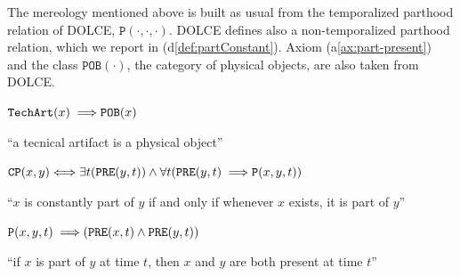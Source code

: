 \documentclass[sw]{iosart2x}
\newcommand{\bflist}{\begin{list}{}{\setlength{\topsep}{2mm}\setlength{\partopsep}{0mm}\setlength{\parsep}{0mm}\setlength{\leftmargin}{9mm}\setlength{\labelwidth}{8mm}}}
\newcommand{\eflist}{\end{list}}
\newcommand{\AxLabel}{\textrm{a}}
\newcommand{\DefLabel}{\textrm{d}}
\newcounter{cntax}
\newcommand{\myax}[1]{\refstepcounter{cntax}\begin{small}{\bf \AxLabel\thecntax\label{ax:#1}}\end{small}}
\newcounter{cntdef}
\newcommand{\mydf}[1]{\refstepcounter{cntdef}\begin{small}{\bf \DefLabel\thecntdef\label{def:#1}}\end{small}}
\newcommand{\mytext}[1]{``#1''}
\newcommand{\refax}[1]{({\AxLabel}\ref{#1})}
\newcommand{\refdf}[1]{({\DefLabel}\ref{#1})}
\newcommand{\generalStyle}[1]{\texttt{#1}}
\newcommand{\biRel}[3]{\generalStyle{#1}(#2,#3)}
\newcommand{\uniRel}[2]{\generalStyle{#1}(#2)}
\newcommand{\triRel}[4]{\generalStyle{#1}(#2,#3,#4)}
\newcommand{\myiff}{\Longleftrightarrow}
\newcommand{\myfi}{\hspace{0.9mm} \Longrightarrow}
\newcommand{\DOLCE}{\textsc{DOLCE}\xspace} %
\newcommand{\DOLCEPhysObj}[1]{\uniRel{{POB}}{#1}}
\newcommand{\DOLCEPartBin}[2]{\biRel{{CP}}{#1}{#2}}
\newcommand{\DOLCEPart}[3]{\triRel{{P}}{#1}{#2}{#3}}
\newcommand{\DOLCEPRE}[2]{\biRel{PRE}{#1}{#2}}
\newcommand{\TechArt}[1]{\uniRel{TechArt}{#1}}
\begin{document}

The mereology mentioned above is built as usual from the temporalized parthood relation of \DOLCE,  $\DOLCEPart{\cdot}{\cdot}{\cdot}$. \DOLCE defines also a non-temporalized parthood relation, which we report in \refdf{def:partConstant}. Axiom \refax{ax:part-present} and the class $\DOLCEPhysObj{\cdot}$, the category of physical objects, are also taken from \DOLCE.
\bflist
\item[\myax{subsumptionTArt}] $ \TechArt{x} \myfi \DOLCEPhysObj{x}$
\item \mytext{a tecnical artifact is a physical object}
\item[\mydf{partConstant}] $ \DOLCEPartBin{x}{y}  \myiff \exists t (\DOLCEPRE{y}{t}) \land \forall t (\DOLCEPRE{y}{t} \myfi \DOLCEPart{x}{y}{t})$
\item \mytext{$x$ is constantly part of $y$ if and only if whenever $x$ exists, it is part of $y$}
\item[\myax{part-present}] $ \DOLCEPart{x}{y}{t} \myfi (\DOLCEPRE{x}{t} \land \DOLCEPRE{y}{t})$
\item \mytext{if $x$ is part of $y$ at time $t$, then $x$ and $y$ are both present at time $t$}
\eflist
\end{document}
